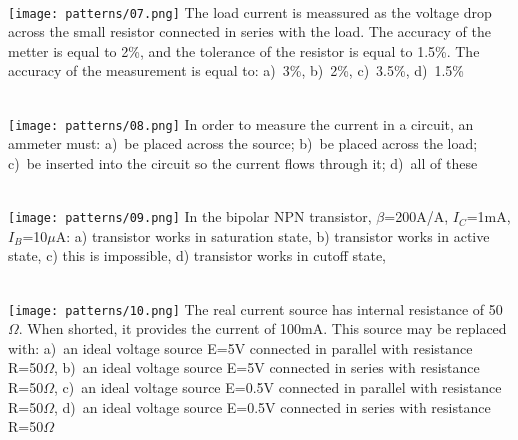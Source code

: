 \documentclass[11pt]{article}
\begin{document}
~\\

\texttt{[image: patterns/07.png]}
 The load current is meassured as the voltage drop across the small resistor
 connected in series with the load. The accuracy of the metter is equal to 2\%, and
 the tolerance of the resistor is equal to 1.5\%. The accuracy of the measurement is
 equal to:
 a)~3\%, b)~2\%, c)~3.5\%, d)~1.5\%

~\\

\texttt{[image: patterns/08.png]}
In order to measure the current in a circuit, an ammeter must:
 a)~be placed across the source;
 b)~be placed across the load;
 c)~be inserted into the circuit so the current flows through it;
 d)~all of these

~\\

\texttt{[image: patterns/09.png]}
 In the bipolar NPN transistor, $\beta$=200A/A, $I_C$=1mA, $I_B$=10$\mu$A:
 a) transistor works in saturation state,
 b) transistor works in active state,
 c) this is impossible,
 d) transistor works in cutoff state,

~\\

\texttt{[image: patterns/10.png]}
The real current source has internal resistance of 50$\Omega$. When shorted, it
  provides the current of 100mA. This source may be replaced with:
  a)~an ideal voltage source E=5V connected in parallel with resistance R=50$\Omega$,
  b)~an ideal voltage source E=5V connected in series with resistance R=50$\Omega$,
  c)~an ideal voltage source E=0.5V connected in parallel with resistance R=50$\Omega$,
  d)~an ideal voltage source E=0.5V connected in series with resistance R=50$\Omega$
\end{document}
